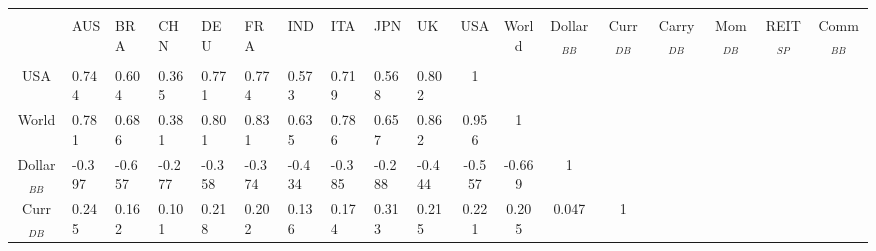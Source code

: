 
		\begin{adjustbox}{width=\textwidth}
		\begin{tabular}{@{\extracolsep{5pt}} cHHHHHHHHHcccccccc} 
\\[-1.8ex]\hline 
\hline \\[-1.8ex] 
 & AUS & BRA & CHN & DEU & FRA & IND & ITA & JPN & UK & USA & World & Dollar$_{BB}$ & Curr$_{DB}$ & Carry$_{DB}$ & Mom$_{DB}$ & REIT$_{SP}$ & Comm$_{BB}$ \\ 
\hline \\[-1.8ex] 
USA & 0.744 & 0.604 & 0.365 & 0.771 & 0.774 & 0.573 & 0.719 & 0.568 & 0.802 & 1 &  &  &  &  &  &  &  \\ 
World & 0.781 & 0.686 & 0.381 & 0.801 & 0.831 & 0.635 & 0.786 & 0.657 & 0.862 & 0.956 & 1 &  &  &  &  &  &  \\ 
Dollar$_{BB}$ & -0.397 & -0.657 & -0.277 & -0.358 & -0.374 & -0.434 & -0.385 & -0.288 & -0.444 & -0.557 & -0.669 & 1 &  &  &  &  &  \\ 
Curr$_{DB}$ & 0.245 & 0.162 & 0.101 & 0.218 & 0.202 & 0.136 & 0.174 & 0.313 & 0.215 & 0.221 & 0.205 & 0.047 & 1 &  &  &  &  \\ 

\end{tabular}
\end{adjustbox}
